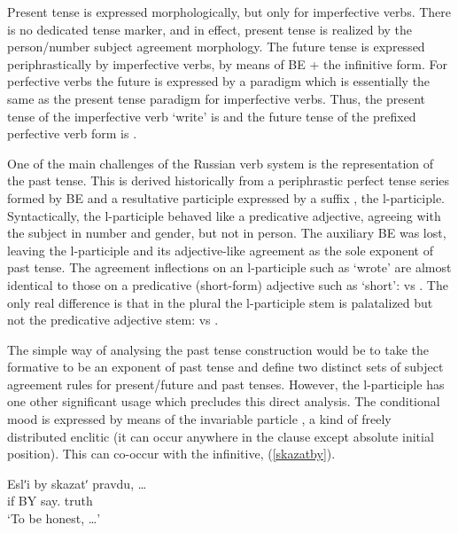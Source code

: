 \documentclass[output=paper,
modfonts
]{LSP/langsci}
\begin{document}
Present tense is expressed morphologically, but only for imperfective verbs. There is no dedicated tense marker, and in effect, present tense is realized by the person/number subject agreement morphology. The future tense is expressed periphrastically by imperfective verbs, by means of BE + the infinitive form. For perfective verbs the future is expressed by a paradigm which is essentially the same as the present tense paradigm for imperfective verbs. Thus, the present tense  of the imperfective verb  ‘write’ is  and the  future tense  of the prefixed perfective verb form  is .

One of the main challenges of the Russian verb system is the representation of the past tense. This is derived historically from a periphrastic perfect tense series formed by  BE and a resultative participle expressed by a suffix , the l-participle. Syntactically, the l-participle behaved like a predicative adjective, agreeing with the subject in number and gender, but not in person. The auxiliary BE was lost, leaving the l-participle and its adjective-like agreement as the sole exponent of past tense. The  agreement inflections on an l-participle such as  ‘wrote’ are almost identical to those on a predicative (short-form) adjective such as  ‘short’:   vs . The only real difference is that in the plural the l-participle stem is palatalized but not the predicative adjective stem:  vs . 

The simple way of analysing the past tense construction would be to take the  formative to be an exponent of past tense and define two distinct sets of subject agreement rules for present/future and past tenses. However, the l-participle has one other significant usage which precludes this direct analysis. The conditional mood is expressed by means of the invariable particle , a kind of freely distributed enclitic (it can occur anywhere in the clause except absolute initial position). This can co-occur with the infinitive, (\ref{skazatby}). 

\begin{minipage}{\linewidth}
\noindent\begin{exe} \ex \label{skazatby}

\gll	Eslʹi by skazatʹ pravdu, \ldots\\
	if BY say. truth\\
	`To be honest, \ldots’

\end{exe}
\end{minipage}\bigskip
 
\end{document}

